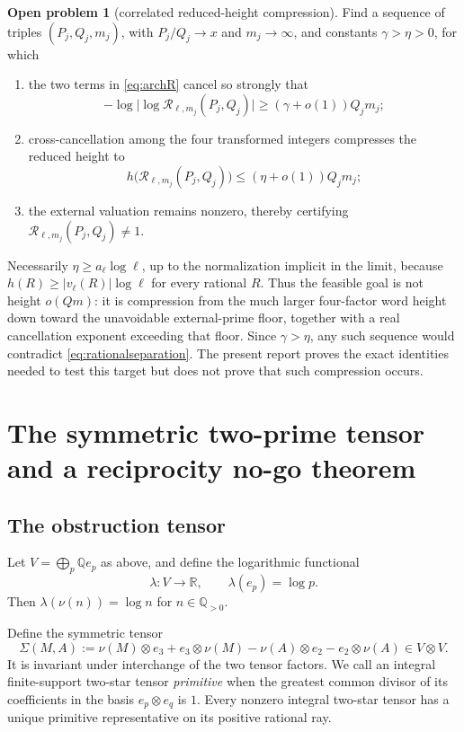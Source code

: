 \documentclass[11pt]{article}
\numberwithin{equation}{section}
\theoremstyle{definition}
\newtheorem{problem}[theorem]{Open problem}
\theoremstyle{remark}
\newcommand{\Q}{\mathbb Q}
\newcommand{\R}{\mathbb R}
\begin{document}
\begin{problem}[correlated reduced-height compression]\label{prob:heightcollapse}
Find a sequence of triples $(P_j,Q_j,m_j)$, with $P_j/Q_j\to x$ and $m_j\to\infty$, and constants $\gamma>\eta>0$, for which
\begin{enumerate}[label=(\roman*)]
  \item the two terms in \eqref{eq:archR} cancel so strongly that
  \[
    -\log\bigl|\log\mathscr R_{\ell,m_j}(P_j,Q_j)\bigr|
    \ge (\gamma+o(1))Q_jm_j;
  \]
  \item cross-cancellation among the four transformed integers compresses the reduced height to
  \[
    h\bigl(\mathscr R_{\ell,m_j}(P_j,Q_j)\bigr)
    \le(\eta+o(1))Q_jm_j;
  \]
  \item the external valuation remains nonzero, thereby certifying
  $\mathscr R_{\ell,m_j}(P_j,Q_j)\ne1$.
\end{enumerate}
Necessarily $\eta\ge a_\ell\log\ell$, up to the normalization implicit in the limit, because
$h(R)\ge |v_\ell(R)|\log\ell$ for every rational $R$.  Thus the feasible goal is not height
$o(Qm)$: it is compression from the much larger four-factor word height down toward the
unavoidable external-prime floor, together with a real cancellation exponent exceeding that
floor.  Since $\gamma>\eta$, any such sequence would contradict \eqref{eq:rationalseparation}.  The present report proves the exact identities needed to test this target but does
not prove that such compression occurs.
\end{problem}

\section{The symmetric two-prime tensor and a reciprocity no-go theorem}

\subsection{The obstruction tensor}

Let $V=\bigoplus_p\Q e_p$ as above, and define the logarithmic functional
\begin{equation}\label{eq:lambda}
  \lambda:V\longrightarrow\R,
  \qquad \lambda(e_p)=\log p.
\end{equation}
Then $\lambda(\nu(n))=\log n$ for $n\in\Q_{>0}$.

Define the symmetric tensor
\begin{equation}\label{eq:Sigma}
  \Sigma(M,A)
  :=\nu(M)\otimes e_3+e_3\otimes\nu(M)
    -\nu(A)\otimes e_2-e_2\otimes\nu(A)
  \in V\otimes V.
\end{equation}
It is invariant under interchange of the two tensor factors.  We call an integral finite-support two-star tensor \emph{primitive} when the greatest common divisor of its coefficients in the basis $e_p\otimes e_q$ is $1$.  Every nonzero integral two-star tensor has a unique primitive representative on its positive rational ray.
\end{document}
